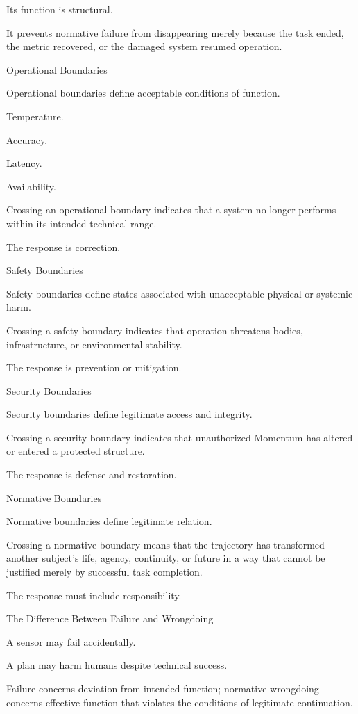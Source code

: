 Its function is structural.

It prevents normative failure from disappearing merely because the task ended, the metric recovered, or the damaged system resumed operation.

Operational Boundaries

Operational boundaries define acceptable conditions of function.

Temperature.

Accuracy.

Latency.

Availability.

Crossing an operational boundary indicates that a system no longer performs within its intended technical range.

The response is correction.

Safety Boundaries

Safety boundaries define states associated with unacceptable physical or systemic harm.

Crossing a safety boundary indicates that operation threatens bodies, infrastructure, or environmental stability.

The response is prevention or mitigation.

Security Boundaries

Security boundaries define legitimate access and integrity.

Crossing a security boundary indicates that unauthorized Momentum has altered or entered a protected structure.

The response is defense and restoration.

Normative Boundaries

Normative boundaries define legitimate relation.

Crossing a normative boundary means that the trajectory has transformed another subject’s life, agency, continuity, or future in a way that cannot be justified merely by successful task completion.

The response must include responsibility.

The Difference Between Failure and Wrongdoing

A sensor may fail accidentally.

A plan may harm humans despite technical success.

Failure concerns deviation from intended function; normative wrongdoing concerns effective function that violates the conditions of legitimate continuation.

